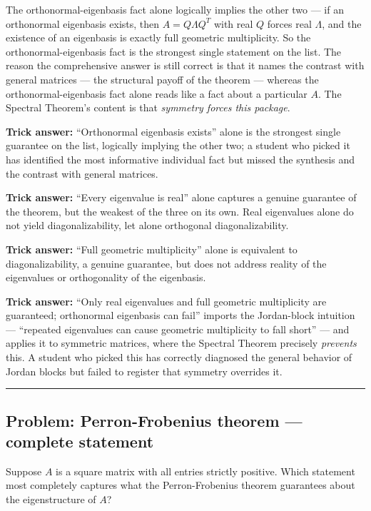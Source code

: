 \documentclass[12pt]{amsart}
\newcommand{\divider}{
  \vspace{-1em}
  \noindent
  \raisebox{-0.15ex}{\textbullet}%
  \hspace{0.5em}%
  \rule[0.5ex]{0.95\textwidth}{1.0pt}%
  \hspace{0.5em}%
  \raisebox{-0.15ex}{\textbullet}%
  \vspace{0em}
}
\begin{document}
The orthonormal-eigenbasis fact alone logically implies the other two ---
if an orthonormal eigenbasis exists, then $A = Q\Lambda Q^T$ with real $Q$
forces real $\Lambda$, and the existence of an eigenbasis is exactly full
geometric multiplicity. So the orthonormal-eigenbasis fact is the
strongest single statement on the list. The reason the comprehensive
answer is still correct is that it names the contrast with general matrices
--- the structural payoff of the theorem --- whereas the orthonormal-eigenbasis
fact alone reads like a fact about a particular $A$. The Spectral Theorem's
content is that \emph{symmetry forces this package}.

\textbf{Trick answer:}
``Orthonormal eigenbasis exists'' alone is the strongest single guarantee
on the list, logically implying the other two; a student who picked it has
identified the most informative individual fact but missed the synthesis
and the contrast with general matrices.

\textbf{Trick answer:}
``Every eigenvalue is real'' alone captures a genuine guarantee of the
theorem, but the weakest of the three on its own. Real eigenvalues alone
do not yield diagonalizability, let alone orthogonal diagonalizability.

\textbf{Trick answer:}
``Full geometric multiplicity'' alone is equivalent to diagonalizability,
a genuine guarantee, but does not address reality of the eigenvalues or
orthogonality of the eigenbasis.

\textbf{Trick answer:}
``Only real eigenvalues and full geometric multiplicity are guaranteed;
orthonormal eigenbasis can fail'' imports the Jordan-block intuition ---
``repeated eigenvalues can cause geometric multiplicity to fall short''
--- and applies it to symmetric matrices, where the Spectral Theorem
precisely \emph{prevents} this. A student who picked this has correctly
diagnosed the general behavior of Jordan blocks but failed to register
that symmetry overrides it.

\divider

\subsection*{Problem: Perron-Frobenius theorem --- complete statement}

Suppose $A$ is a square matrix with all entries strictly positive. Which
statement most completely captures what the Perron-Frobenius theorem
guarantees about the eigenstructure of $A$?
\end{document}
